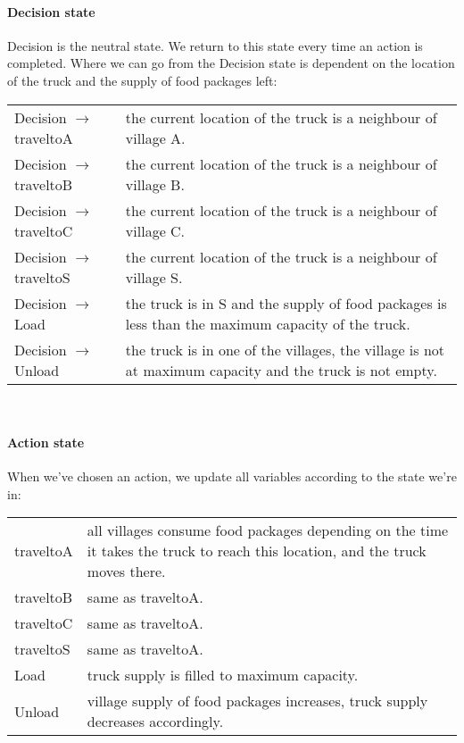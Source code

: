 \documentclass[12pt]{article}
\begin{document}
\paragraph{Decision state}
Decision is the neutral state. 
We return to this state every time an action is completed. 
Where we can go from the Decision state is dependent on 
the location of the truck and the supply of food packages left:
\begin{center}
\begin{tabular}{|l|p{12cm}|}
\hline
Decision $\rightarrow$ traveltoA & the current location of the truck is a neighbour of village A.\\
Decision $\rightarrow$ traveltoB & the current location of the truck is a neighbour of village B.\\
Decision $\rightarrow$ traveltoC & the current location of the truck is a neighbour of village C.\\
Decision $\rightarrow$ traveltoS & the current location of the truck is a neighbour of village S.\\
Decision $\rightarrow$ Load & the truck is in S and the supply of food packages
	is less than the maximum capacity of the truck.\\
Decision $\rightarrow$ Unload & the truck is in one of the villages, 
	the village is not at maximum capacity and 
	the truck is not empty.\\
\hline
\end{tabular}\\
\end{center}

\paragraph{Action state}
When we've chosen an action, we update all variables according to the state we're in:
\begin{center}
\begin{tabular}{|l|p{12cm}|}
\hline
traveltoA & all villages consume food packages 
	depending on the time it takes the truck to reach this location, and the truck moves there.\\
traveltoB & same as traveltoA.\\
traveltoC & same as traveltoA.\\
traveltoS & same as traveltoA.\\
Load & truck supply is filled to maximum capacity.\\ 
Unload & village supply of food packages increases, 
	truck supply decreases accordingly.\\
\hline
\end{tabular}
\end{center}
\end{document}
